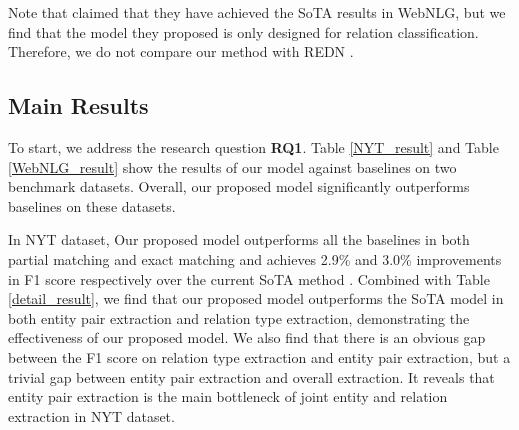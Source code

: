 \documentclass[letterpaper]{article} \usepackage{aaai21}  \usepackage{times}  \usepackage{helvet} \usepackage{courier}  \usepackage[hyphens]{url}  \usepackage{graphicx} \usepackage{amsfonts,amssymb}
\begin{document}
Note that \citet{li2020downstream} claimed that they have achieved the SoTA results in WebNLG, but we find that the model they proposed is only designed for relation classification. Therefore, we do not compare our method with REDN \cite{li2020downstream}.





\subsection{Main Results}

To start, we address the research question \textbf{RQ1}. Table \ref{NYT_result} and Table \ref{WebNLG_result} show the results of our model against baselines on two benchmark datasets. Overall, our proposed model significantly outperforms baselines on these datasets.

In NYT dataset, Our proposed model outperforms all the baselines in both partial matching and exact matching and achieves 2.9\% and 3.0\% improvements in F1 score respectively over the current SoTA method \cite{wei-etal-2020-novel}. Combined with Table \ref{detail_result}, we find that our proposed model outperforms the SoTA model \cite{wei-etal-2020-novel} in both entity pair extraction and relation type extraction, demonstrating the effectiveness of our proposed model. We also find that there is an obvious gap between the F1 score on relation type extraction and entity pair extraction, but a trivial gap between entity pair extraction and overall extraction. It reveals that entity pair extraction is the main bottleneck of joint entity and relation extraction in NYT dataset. 
\end{document}

